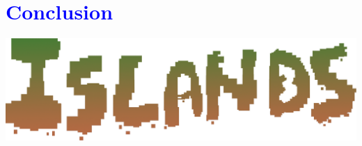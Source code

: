 \documentclass[article]{report} %
\begin{document}
	\chapter{\textcolor{blue}{Conclusion}}

					 

					


				\begin{center}
					\includegraphics[width = 16cm]{Images/Islands_Title.png}
				\end{center}     	     		
\end{document}
